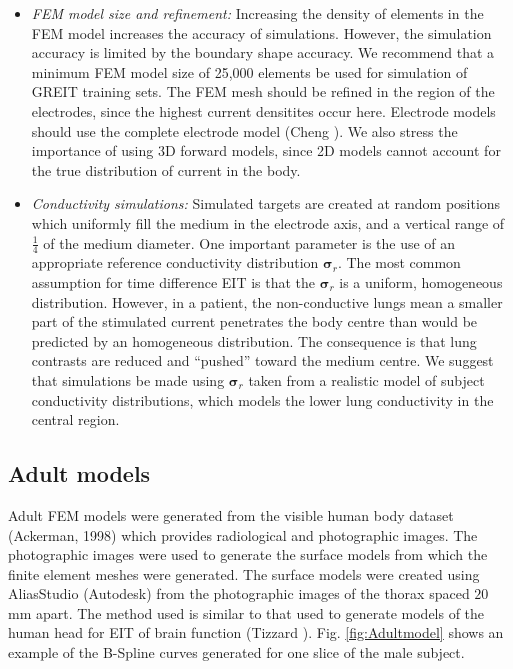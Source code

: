 \documentclass[12pt]{iopart}
\newcommand{\sG}{\mbox{${\boldsymbol \sigma}$}}
\begin{document}
\begin{itemize}
\item 
{\em FEM model size and refinement:}
Increasing the density of elements in the FEM
model increases the accuracy of simulations. However,
the simulation accuracy is limited by the boundary
shape accuracy.
We recommend that a minimum FEM model size of 25,000
elements be used for simulation of
GREIT training sets.
The FEM mesh should be refined in the region of
the electrodes, since the highest current densitites
occur here. Electrode models should use the
complete electrode model (Cheng ).
We also stress the importance of using 3D 
forward models, since 2D models
 cannot account for the true
distribution of current in the body.

\item
{\em Conductivity simulations:}
Simulated targets are created at random positions
which uniformly fill the medium in the electrode axis, and
a vertical range of $\frac{1}{4}$ of the medium
diameter.  One important parameter is the use of
an appropriate reference conductivity distribution
$\sG_r$. The most common assumption for time 
difference EIT is that the $\sG_r$ is a uniform,
homogeneous distribution. However, in a patient,
the non-conductive lungs mean
a smaller part of the stimulated current penetrates
the body centre than would be predicted by an
homogeneous distribution. The consequence is that
lung contrasts are reduced and ``pushed'' toward
the medium centre.  We suggest that 
simulations be made using $\sG_r$ taken from a
realistic model of subject conductivity distributions,
which models the lower lung conductivity in 
the central region.

\end{itemize}



\subsection{Adult models}

Adult FEM models were generated from the visible human body dataset
(Ackerman, 1998) which provides radiological and photographic
images.  The photographic images were used to generate the surface models
from which the finite element meshes were generated.  The surface models
were created using AliasStudio (Autodesk) from the
photographic images of the thorax spaced $20~$mm apart. The method used
is similar to that used to generate models of the human head for EIT of
brain function (Tizzard ). 
Fig. \ref{fig:Adultmodel} shows an example of the
B-Spline curves generated for one slice of the male subject.
\end{document}
